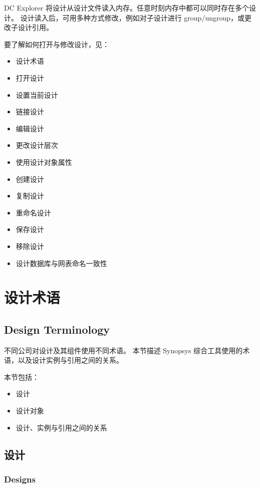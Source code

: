\label{chap:memory}

DC Explorer 将设计从设计文件读入内存。任意时刻内存中都可以同时存在多个设计。
设计读入后，可用多种方式修改，例如对子设计进行 group/ungroup，或更改子设计引用。

要了解如何打开与修改设计，见：
\begin{itemize}
  \item 设计术语
  \item 打开设计
  \item 设置当前设计
  \item 链接设计
  \item 编辑设计
  \item 更改设计层次
  \item 使用设计对象属性
  \item 创建设计
  \item 复制设计
  \item 重命名设计
  \item 保存设计
  \item 移除设计
  \item 设计数据库与网表命名一致性
\end{itemize}

\section{设计术语}
\subsection*{Design Terminology}

不同公司对设计及其组件使用不同术语。
本节描述 Synopsys 综合工具使用的术语，以及设计实例与引用之间的关系。

本节包括：
\begin{itemize}
  \item 设计
  \item 设计对象
  \item 设计、实例与引用之间的关系
\end{itemize}

\subsection{设计}
\subsubsection*{Designs}

